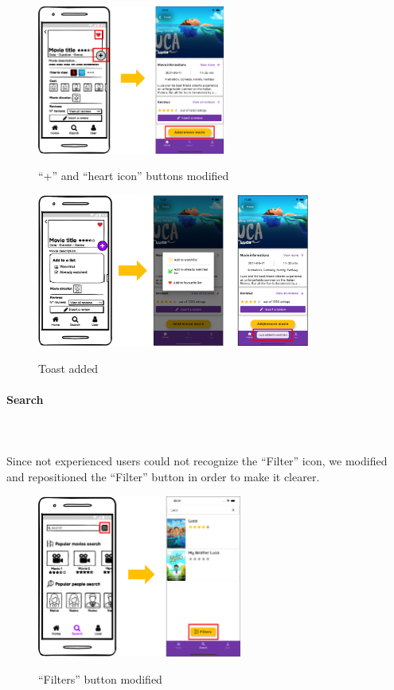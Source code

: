 \documentclass[12pt, a4paper]{article}
\numberwithin{figure}{section}
\begin{document}
\begin{figure}[H]
	\centering
	\includegraphics[width=0.55\textwidth]{images/prototype1/addBtn.png}\\
	\caption{“+” and “heart icon” buttons modified}
	\label{addBtn}
\end{figure}
\begin{figure}[H]
	\centering
	\includegraphics[width=0.8\textwidth]{images/prototype1/addToList.png}\\
	\caption{Toast added}
	\label{toastAddMovie}
\end{figure}

\paragraph{Search}\mbox{}\\\\
Since not experienced users could not recognize the “Filter” icon, we modified and repositioned the
“Filter” button in order to make it clearer.\\

\begin{figure}[H]
	\centering
	\includegraphics[width=0.6\textwidth]{images/prototype1/filters.png}\\
	\caption{“Filters” button modified}
\end{figure}
\end{document}
